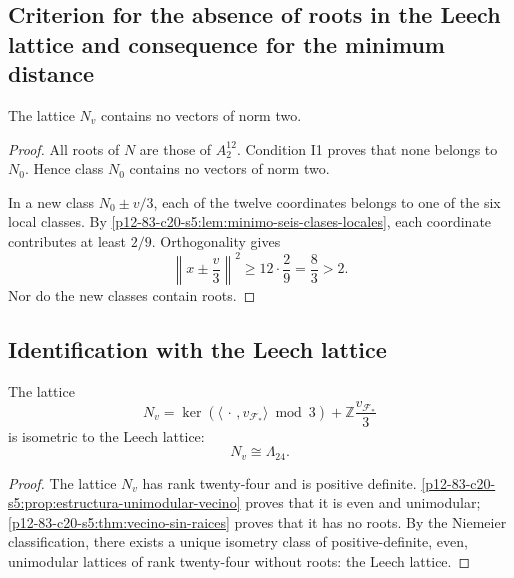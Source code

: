\subsection{Criterion for the absence of roots in the Leech lattice and consequence for the minimum distance}

\begin{theorem}
\label{p12-83-c20-s5:thm:vecino-sin-raices}
The lattice \(N_v\) contains no vectors of norm two.
\end{theorem}

\begin{proof}
All roots of \(N\) are those of \(A_2^{12}\). Condition I1 proves
that none belongs to \(N_0\). Hence class \(N_0\) contains no
vectors of norm two.

In a new class \(N_0\pm v/3\), each of the twelve coordinates
belongs to one of the six local classes. By
\cref{p12-83-c20-s5:lem:minimo-seis-clases-locales}, each coordinate contributes at least
\(2/9\). Orthogonality gives
\[
 \left\|x\pm\frac v3\right\|^2
 \geq12\cdot\frac29=\frac83>2.
\]
Nor do the new classes contain roots.
\end{proof}

\subsection{Identification with the Leech lattice}

\begin{theorem}
\label{p12-83-c20-s5:thm:identificacion-vecino-leech}
The lattice
\begin{equation}
 N_v
 =\ker(\langle\,\cdot\,,v_{\mathcal F_*}\rangle\bmod3)
  +\mathbb Z\frac{v_{\mathcal F_*}}3
 \label{p12-83-c20-s5:eq:formula-final-vecino-leech}
\end{equation}
is isometric to the Leech lattice:
\begin{equation}
 \boxed{N_v\cong\Lambda_{24}.}
 \label{p12-83-c20-s5:eq:identificacion-leech-autonoma}
\end{equation}
\end{theorem}

\begin{proof}
The lattice \(N_v\) has rank twenty-four and is positive definite.
\cref{p12-83-c20-s5:prop:estructura-unimodular-vecino} proves that it is even and unimodular;
\cref{p12-83-c20-s5:thm:vecino-sin-raices} proves that it has no roots. By the
Niemeier classification, there exists a unique isometry class of positive-definite,
even, unimodular lattices of rank twenty-four without roots:
the Leech lattice.
\end{proof}

